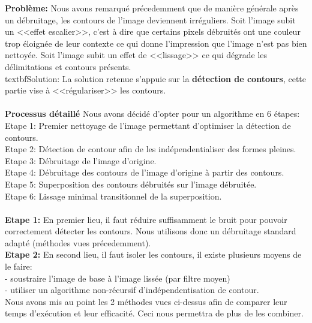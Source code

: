 \documentclass{article}
\begin{document}
	
		\textbf{Problème: }Nous avons remarqué précedemment que de manière générale après un débruitage, les contours de l'image deviennent irréguliers. Soit l'image subit un <<effet escalier>>, c'est à dire que certains pixels débruités ont une couleur trop éloignée de leur contexte ce qui donne l'impression que l'image n'est pas bien nettoyée. Soit l'image subit un effet de <<lissage>> ce qui dégrade les délimitations et contours présents.\\
			textbf{Solution: }La solution retenue s'appuie sur la \textbf{détection de contours}, cette partie vise à <<régulariser>> les contours.\\\\
		\textbf{Processus détaillé}
		 Nous avons décidé d'opter pour un algorithme en 6 étapes:\\
			\indent Etape 1: Premier nettoyage de l'image permettant d'optimiser la détection de contours.\\
			\indent Etape 2: Détection de contour afin de les indépendentialiser des formes pleines.\\
			\indent Etape 3: Débruitage de l'image d'origine.\\
			\indent Etape 4: Débruitage des contours de l'image d'origine à partir des contours.\\
			\indent Etape 5: Superposition des contours débruités sur l'image débruitée.\\
			\indent Etape 6: Lissage minimal transitionnel de la superposition.\\\\	
			\textbf{Etape 1: }En premier lieu, il faut réduire suffisamment le bruit pour pouvoir correctement détecter les contours. Nous utilisons donc un débruitage standard adapté (méthodes vues précedemment).\\
			\textbf{Etape 2: }En second lieu, il faut isoler les contours, il existe plusieurs moyens de le faire:\\
			- soustraire l'image de base à l'image lissée (par filtre moyen)\\
			- utiliser un algorithme non-récursif d'indépendentisation de contour.\\
			Nous avons mis au point les 2 méthodes vues ci-dessus afin de comparer leur temps d'exécution et leur efficacité. Ceci nous permettra de plus de les combiner.\\
			
\end{document}

